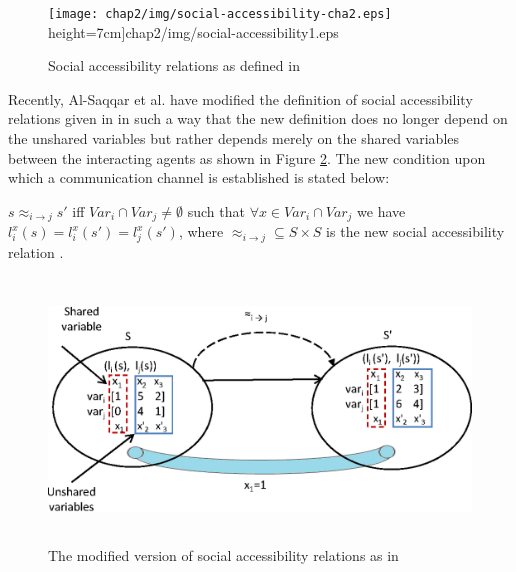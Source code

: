     \begin{figure}[!ht]
                \begin{center}
                \texttt{[image: chap2/img/social-accessibility-cha2.eps]}
                height=7cm]{chap2/img/social-accessibility1.eps}
                \end{center}
                \caption{Social accessibility relations as defined in \cite{Bentahar2012,El-Menshawy2013a}}
                \label{fig:social accessibility-cha2}
    \end{figure}

Recently, Al-Saqqar et al. \cite{Al-Saqqar2014a} have modified the definition of social accessibility relations given in \cite{Bentahar2012,El-Menshawy2013a} in such a way that the new definition does no longer depend on the unshared variables but rather depends merely on the shared variables between the interacting agents as shown in Figure \ref{fig:modified social accessibility-cha2}. The new condition upon which a communication channel is established is stated below:

 $ s \approx_{i \rightarrow j} s' $ iff $ Var_i \cap Var_j \neq \emptyset $ such that $ \forall x \in Var_i \cap Var_j $ we have $ l_i^x(s) =
l_i^x(s') = l_j^x(s')$, where $\approx_{i\rightarrow j} \subseteq S \times S$ is the new social accessibility relation \cite{Al-Saqqar2014a}.

    \begin{figure}[!ht]
                \begin{center}
                \includegraphics[width=12cm, height=7cm]{chap2/img/social-accessibility2.eps}
                \end{center}
                \caption{The modified version of social accessibility relations as in \cite{Al-Saqqar2014a}}
                \label{fig:modified social accessibility-cha2}
    \end{figure}


